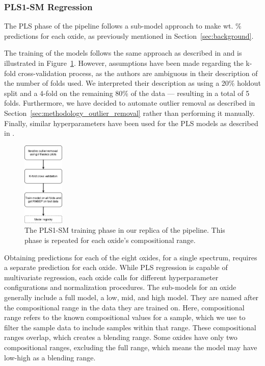 \subsubsection{PLS1-SM Regression}\label{sec:methodology_pls1-sm_regression}
The PLS phase of the pipeline follows a sub-model approach to make wt. \% predictions for each oxide, as previously mentioned in Section~\ref{sec:background}.

The training of the models follows the same approach as described in \citet{andersonImprovedAccuracyQuantitative2017} and is illustrated in Figure~\ref{fig:pls_training}.
However, assumptions have been made regarding the k-fold cross-validation process, as the authors are ambiguous in their description of the number of folds used.
We interpreted their description as using a 20\% holdout split and a 4-fold on the remaining 80\% of the data --- resulting in a total of 5 folds.
Furthermore, we have decided to automate outlier removal as described in Section~\ref{sec:methodology_outlier_removal} rather than performing it manually.
Finally, similar hyperparameters have been used for the PLS models as described in \citet{andersonImprovedAccuracyQuantitative2017}.

\begin{figure}
	\centering
	\includegraphics[width=0.175\textwidth]{images/pls_training.png}
	\caption{The PLS1-SM training phase in our replica of the pipeline. This phase is repeated for each oxide's compositional range.}
	\label{fig:pls_training}
\end{figure}

Obtaining predictions for each of the eight oxides, for a single spectrum, requires a separate prediction for each oxide. While PLS regression is capable of multivariate regression, each oxide calls for different hyperparameter configurations and normalization procedures.
The sub-models for an oxide generally include a full model, a low, mid, and high model. They are named after the compositional range in the data they are trained on. Here, compositional range refers to the known compositional values for a sample, which we use to filter the sample data to include samples within that range.
These compositional ranges overlap, which creates a blending range.
Some oxides have only two compositional ranges, excluding the full range, which means the model may have low-high as a blending range.

